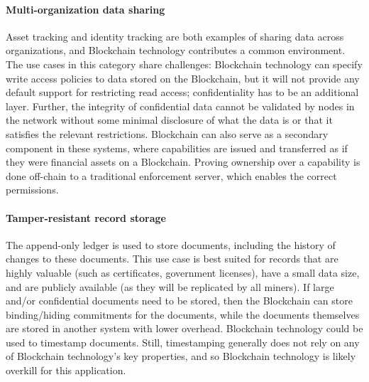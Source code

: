 \paragraph{Multi-organization data sharing}

Asset tracking and identity tracking are both examples of sharing data across organizations, and Blockchain technology contributes a common environment.
The use cases in this category share challenges: Blockchain technology can specify write access policies to data stored on the Blockchain, but it will not provide any default support for restricting read access; confidentiality has to be an additional layer.
Further, the integrity of confidential data cannot be validated by nodes in the network without some minimal disclosure of what the data is or that it satisfies the relevant restrictions.
Blockchain can also serve as a secondary component in these systems, where capabilities are issued and transferred as if they were financial assets on a Blockchain. Proving ownership over a capability is done off-chain to a traditional enforcement server, which enables the correct permissions.


\paragraph{Tamper-resistant record storage}
The append-only ledger is used to store documents, including the history of changes to these documents.
This use case is best suited for records that are highly valuable (such as certificates, government licenses), have a small data size, and are publicly available (as they will be replicated by all miners).
If large and/or confidential documents need to be stored, then the Blockchain can store binding/hiding commitments for the documents, while the documents themselves are stored in another system with lower overhead.
Blockchain technology could be used to timestamp documents. Still, timestamping generally does not rely on any of Blockchain technology's key properties, and so Blockchain technology is likely overkill for this application.



